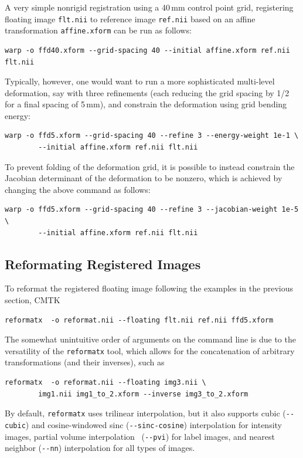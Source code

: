 \documentclass{InsightArticle}
\begin{document}
A very simple nonrigid registration using a 40\,mm control point grid,
registering floating image \verb|flt.nii| to reference image \verb|ref.nii|
based on an affine transformation \verb|affine.xform| can be run as follows:
\begin{verbatim}
warp -o ffd40.xform --grid-spacing 40 --initial affine.xform ref.nii flt.nii
\end{verbatim}
Typically, however, one would want to run a more sophisticated multi-level
deformation, say with three refinements (each reducing the grid spacing by
1/2 for a final spacing of 5\,mm), and constrain the deformation using grid
bending energy:
\begin{verbatim}
warp -o ffd5.xform --grid-spacing 40 --refine 3 --energy-weight 1e-1 \
        --initial affine.xform ref.nii flt.nii
\end{verbatim}
To prevent folding of the deformation grid, it is possible to instead
constrain the Jacobian determinant of the deformation to be nonzero, which is
achieved by changing the above command as follows:
\begin{verbatim}
warp -o ffd5.xform --grid-spacing 40 --refine 3 --jacobian-weight 1e-5 \
        --initial affine.xform ref.nii flt.nii
\end{verbatim}

\subsection{Reformating Registered Images}

To reformat the registered floating image following the examples in
the previous section, CMTK
\begin{verbatim}
reformatx  -o reformat.nii --floating flt.nii ref.nii ffd5.xform
\end{verbatim}
The somewhat unintuitive order of arguments on the command line is due to the
versatility of the \verb|reformatx| tool, which allows for the concatenation
of arbitrary transformations (and their inverses), such as
\begin{verbatim}
reformatx  -o reformat.nii --floating img3.nii \
        img1.nii img1_to_2.xform --inverse img3_to_2.xform
\end{verbatim} 
By default, \verb|reformatx| uses trilinear interpolation, but it also
supports cubic (\verb|--cubic|) and cosine-windowed sinc
(\verb|--sinc-cosine|) interpolation for intensity images, partial volume
interpolation~\cite{MaesCollVand:1997} (\verb|--pvi|) for label images, and
nearest neighbor (\verb|--nn|) interpolation for all types of images.
\end{document}
